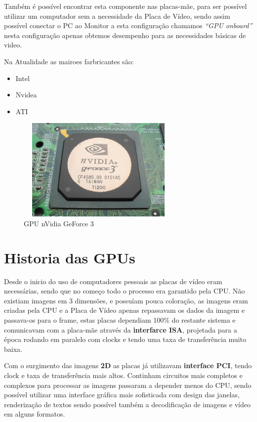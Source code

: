 \documentclass{report}
\begin{document}
Também é possível encontrar esta componente nas placas-mãe, para ser possível utilizar um computador sem a necessidade da Placa de Vídeo, sendo assim possível conectar o PC ao Monitor a esta configuração chamamos \textit{“GPU onboard”} nesta configuração apenas obtemos desempenho para as necessidades básicas de video.

Na Atualidade as mairoes farbricantes são:
\begin{itemize}
    \item Intel
    \item Nvidea
    \item ATI
\end{itemize}
  
\begin{figure}
\center
\includegraphics[width=8cm, height=5cm]{Imagens/GPU1.jpg}
\caption{GPU nVidia GeForce 3}
\end{figure} 

\section{Historia das GPUs}
\label{sect.Historia das GPUs}
Desde o inicio do uso de computadores pessoais as placas de vídeo eram necessárias, sendo que no começo todo o processo era garantido pela \ac{CPU}. Não existiam imagens em 3 dimensões, e possuíam pouca coloração, as imagens eram criadas pela \ac{CPU} e a Placa de Vídeo apenas repassavam os dados da imagem e passava-os para o frame, estas placas dependiam 100\% do restante sistema e comunicavam com a placa-mãe através da \textbf{interfarce ISA}, projetada para a época rodando em paralelo com clocks e tendo uma taxa de transferência muito baixa. 	

Com o surgimento das imagens \textbf{2D} as placas já utilizavam \textbf{interface PCI}, tendo clock e taxa de transferência mais altos. Continham circuitos mais completos e complexos para processar as imagens passaram a depender menos do \ac{CPU}, sendo possível utilizar uma interface gráfica mais sofisticada com design das janelas, renderização de textos sendo possível também a decodificação de imagens e vídeo em alguns formatos.
\end{document}
